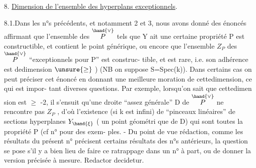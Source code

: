 
8. \uline{Dimension de l'ensemble des hyperplans exceptionnels}.

8.1.Dans les n°s précédents, et notamment 2 et 3, nous avons donné des
énoncés affirmant que l'ensemble des \hand{$\xi\in$} $\overset{\hand{\vee}}{P}$ tels que Y ait une certaine
propriété P est constructible, et contient le point générique\hand{/},  ou
encore que l'ensemble $Z_P$ des \hand{$\xi\in$} $\overset{\hand{\vee}}{P}$ ``exceptionnels pour P'' est construc-%
tible, et est rare, i.e. son adhérence est dedimension $\unsure{\geq}$ ) 
(NB on suppose S=Spec(k)). Dans certains cas on peut préciser cet énoncé
en donnant une meilleure moration de cettedimension, ce qui est impor-%
tant  diverses questions. Par exemple, lorsqu'on sait que cettedimen
sion est $\geq$ -2, il s'ensuit qu'une droite ``assez générale'' D de $\overset{\hand{\vee}}{P}$
ne rencontre pas $Z_P$ , d'où l'existence (si k est infini) de ``pinceaux
linéaires'' de sections hyperplanes  $Y_{\hand{\xi}}$ (\hand{$\xi$} un point géométri
que de D) qui sont toutes la propriété P (cf n°  pour des exem-%
ples. - Du point de vue rédaction, comme les résultats du présent n°
précisent certains résultats des n°s antérieurs, la question se pose s'il
y a bien lieu de faire ce ratrappage dans un n° à part, ou de donner la
version précisée à mesure. Redactor decidetur.

